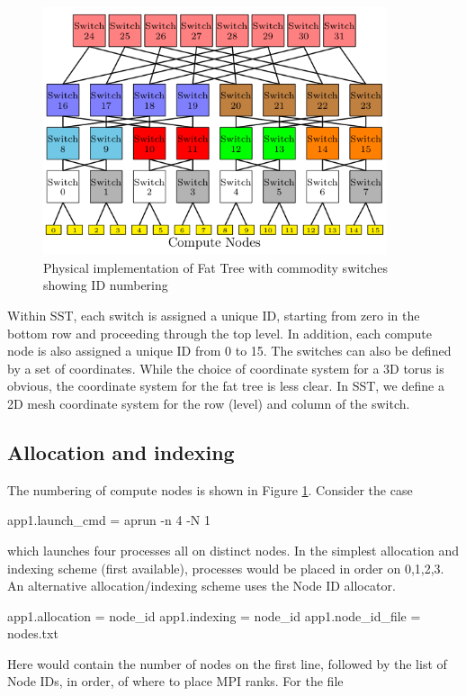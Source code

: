 \begin{figure}[h!]
\centering
\includegraphics[width=0.9\textwidth]{figures/tikz/fattree/fattree_ids.png}
\caption{Physical implementation of Fat Tree with commodity switches showing ID numbering}
\label{fig:topologies:fattreeids}
\end{figure}

Within SST, each switch is assigned a unique ID, starting from zero in the bottom row and proceeding through the top level.
In addition, each compute node is also assigned a unique ID from 0 to 15.
The switches can also be defined by a set of coordinates.
While the choice of coordinate system for a 3D torus is obvious, 
the coordinate system for the fat tree is less clear.
In SST, we define a 2D mesh coordinate system for the row (level) and column of the switch.


\subsection{Allocation and indexing}
\label{subsec:fattree:allocation}
The numbering of compute nodes is shown in Figure \ref{fig:topologies:fattreeids}.
Consider the case

\begin{ViFile}
app1.launch_cmd = aprun -n 4 -N 1
\end{ViFile}
which launches four processes all on distinct nodes.
In the simplest allocation and indexing scheme (first available),
processes would be placed in order on 0,1,2,3.
An alternative allocation/indexing scheme uses the Node ID allocator.

\begin{ViFile}
app1.allocation = node_id
app1.indexing = node_id
app1.node_id_file = nodes.txt
\end{ViFile}
Here  would contain the number of nodes on the first line, followed by the list of Node IDs, in order, of where to place MPI ranks.
For the file

